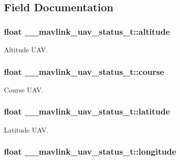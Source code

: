 \subsection{Field Documentation}
\hypertarget{struct____mavlink__uav__status__t_a7b8803502cad004dfef1243e40f5b425}{
\subsubsection[{altitude}]{\setlength{\rightskip}{0pt plus 5cm}float \+\_\+\+\_\+mavlink\+\_\+uav\+\_\+status\+\_\+t\+::altitude}}\label{struct____mavlink__uav__status__t_a7b8803502cad004dfef1243e40f5b425}


Altitude U\+A\+V. 

\hypertarget{struct____mavlink__uav__status__t_a2ce49c6bc127e6191ed1972e78cf89b3}{
\subsubsection[{course}]{\setlength{\rightskip}{0pt plus 5cm}float \+\_\+\+\_\+mavlink\+\_\+uav\+\_\+status\+\_\+t\+::course}}\label{struct____mavlink__uav__status__t_a2ce49c6bc127e6191ed1972e78cf89b3}


Course U\+A\+V. 

\hypertarget{struct____mavlink__uav__status__t_ad4ddce7157d75cf73751428fc1209955}{
\subsubsection[{latitude}]{\setlength{\rightskip}{0pt plus 5cm}float \+\_\+\+\_\+mavlink\+\_\+uav\+\_\+status\+\_\+t\+::latitude}}\label{struct____mavlink__uav__status__t_ad4ddce7157d75cf73751428fc1209955}


Latitude U\+A\+V. 

\hypertarget{struct____mavlink__uav__status__t_a3081ef5a1282398b18ba873255c0b65a}{
\subsubsection[{longitude}]{\setlength{\rightskip}{0pt plus 5cm}float \+\_\+\+\_\+mavlink\+\_\+uav\+\_\+status\+\_\+t\+::longitude}}\label{struct____mavlink__uav__status__t_a3081ef5a1282398b18ba873255c0b65a}


